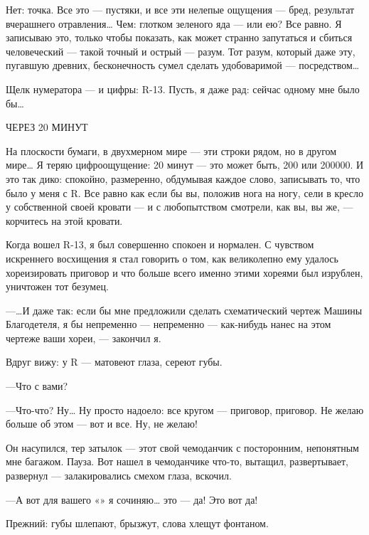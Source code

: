 \documentclass[11pt,openany]{book}
\begin{document}
Нет: точка. Все это --- пустяки, и все эти нелепые ощущения --- бред, результат вчерашнего отравления\ldots{} Чем: глотком зеленого яда --- или ею? Все равно. Я записываю это, только чтобы показать, как может странно запутаться и сбиться человеческий --- такой точный и острый --- разум. Тот разум, который даже эту, пугавшую древних, бесконечность сумел сделать удобоваримой --- посредством\ldots{}

Щелк нумератора --- и цифры: R-13. Пусть, я даже рад: сейчас одному мне было бы\ldots{}

\begin{center}\textsc{ЧЕРЕЗ 20 МИНУТ}\end{center}

На плоскости бумаги, в двухмерном мире --- эти строки рядом, но в другом мире\ldots{} Я теряю цифроощущение: 20 минут --- это может быть, 200 или 200000. И это так дико: спокойно, размеренно, обдумывая каждое слово, записывать то, что было у меня с R. Все равно как если бы вы, положив нога на ногу, сели в кресло у собственной своей кровати --- и с любопытством смотрели, как вы, вы же, --- корчитесь на этой кровати.

Когда вошел R-13, я был совершенно спокоен и нормален. С чувством искреннего восхищения я стал говорить о том, как великолепно ему удалось хореизировать приговор и что больше всего именно этими хореями был изрублен, уничтожен тот безумец.

---\ldots{}И даже так: если бы мне предложили сделать схематический чертеж Машины Благодетеля, я бы непременно --- непременно --- как-нибудь нанес на этом чертеже ваши хореи, --- закончил я.

Вдруг вижу: у R --- матовеют глаза, сереют губы.

---Что с вами?

---Что-что? Ну\ldots{} Ну просто надоело: все кругом --- приговор, приговор. Не желаю больше об этом --- вот и все. Ну, не желаю!

Он насупился, тер затылок --- этот свой чемоданчик с посторонним, непонятным мне багажом. Пауза. Вот нашел в чемоданчике что-то, вытащил, развертывает, развернул --- залакировались смехом глаза, вскочил.

---А вот для вашего «» я сочиняю\ldots{} это --- да! Это вот да!

Прежний: губы шлепают, брызжут, слова хлещут фонтаном.
\end{document}
